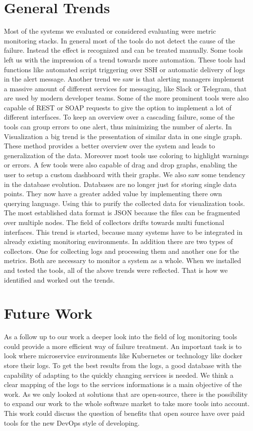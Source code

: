\section{General Trends}
\label{generaltrends}
Most of the systems we evaluated or considered evaluating were metric monitoring stacks. In general most of the tools do not detect the cause of the failure. Instead the effect is recognized and can be treated manually. Some tools left us with the impression of a trend towards more automation. These tools had functions like automated script triggering over SSH or automatic delivery of logs in the alert message. 
Another trend we saw is that alerting managers implement a massive amount of different services for messaging, like Slack or Telegram, that are used by modern developer teams. Some of the more prominent tools were also capable of REST or SOAP requests to give the option to implement a lot of different interfaces. To keep an overview over a cascading failure, some of the tools can group errors to one alert, thus minimizing the number of alerts.
In Visualization a big trend is the presentation of similar data in one single graph. These method provides a better overview over the system and leads to generalization of the data. Moreover most tools use coloring to highlight warnings or errors. A few tools were also capable of drag and drop graphs, enabling the user to setup a custom dashboard with their graphs.
We also saw some tendency in the database evolution. Databases are no longer just for storing single data points. They now have a greater added value by implementing there own querying language. Using this to purify the collected data for visualization tools. The most established data format is JSON because the files can be fragmented over multiple nodes.
The field of collectors drifts towards multi functional interfaces. This trend is started, because many systems have to be integrated in already existing monitoring environments. In addition there are two types of collectors. One for collecting logs and processing them and another one for the metrics. Both are necessary to monitor a system as a whole.
When we installed and tested the tools, all of the above trends were reflected. That is how we identified and worked out the trends. 

\section{Future Work}
\label{futurework}
As a follow up to our work a deeper look into the field of log monitoring tools could provide a more efficient way of failure treatment. An important task is to look where microservice environments like Kubernetes or technology like docker store their logs. To get the best results from the logs, a good database with the capability of adapting to the quickly changing services is needed. We think a clear mapping of the logs to the services informations is a main objective of the work.
As we only looked at solutions that are open-source, there is the possibility to expand our work to the whole software market to take more tools into account. This work could discuss the question of benefits that open source have over paid tools for the new DevOps style of developing.

